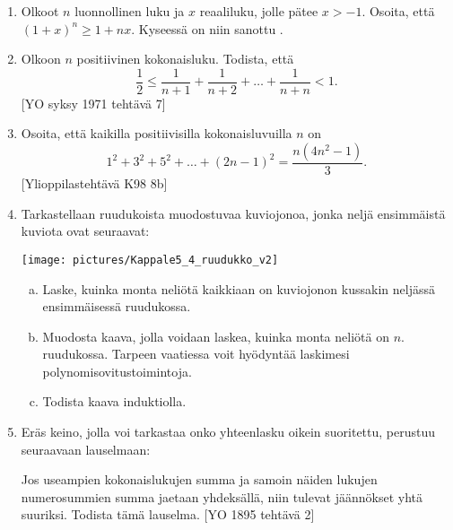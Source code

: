 \begin{enumerate}
\item Olkoot $n$ luonnollinen luku ja $x$ reaaliluku, jolle pätee $x > -1$. Osoita, että $(1 + x)^n \ge 1 + nx$. Kyseessä on niin sanottu .

\item Olkoon $n$ positiivinen kokonaisluku. Todista, että
\[
\frac{1}{2}\le\frac{1}{n+1}+\frac{1}{n+2}+\ldots +\frac{1}{n+n} <1.
\]
[YO syksy 1971 tehtävä 7]


\item
Osoita, että kaikilla positiivisilla kokonaisluvuilla $n$ on
\[
1^2+3^2+5^2+\ldots+(2n-1)^2 = \frac{n(4n^2-1)}{3}. 
\]
[Ylioppilastehtävä K98 8b]

\item Tarkastellaan ruudukoista muodostuvaa kuviojonoa, jonka neljä ensimmäistä kuviota ovat seuraavat:

\begin{center}
\texttt{[image: pictures/Kappale5\_4\_ruudukko\_v2]}
\end{center}

\begin{enumerate}[a)]
\item Laske, kuinka monta neliötä kaikkiaan on kuviojonon kussakin neljässä ensimmäisessä ruudukossa.
\item Muodosta kaava, jolla voidaan laskea, kuinka monta neliötä on $n$. ruudukossa. Tarpeen vaatiessa voit hyödyntää laskimesi polynomisovitustoimintoja.
\item Todista kaava induktiolla.
\end{enumerate}

\item Eräs keino, jolla voi tarkastaa onko yhteenlasku oikein suoritettu, perustuu seuraavaan lauselmaan:

Jos useampien kokonaislukujen summa ja samoin näiden lukujen numerosummien summa jaetaan yhdeksällä, niin tulevat jäännökset yhtä suuriksi. Todista tämä lauselma.
[YO 1895 tehtävä 2]


\end{enumerate}
